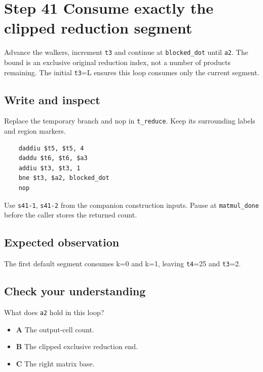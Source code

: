 \section{Step 41 Consume exactly the clipped reduction segment}\label{matmul-s41}

Advance the walkers, increment \texttt{t3} and continue at \texttt{blocked\_dot} until \texttt{a2}. The bound is an exclusive original reduction index, not a number of products remaining. The initial \texttt{t3}=L ensures this loop consumes only the current segment.

\subsection{Write and inspect}
Replace the temporary branch and nop in \texttt{t\_reduce}. Keep its surrounding labels and region markers.

\begin{verbatim}
    daddiu $t5, $t5, 4
    daddu $t6, $t6, $a3
    addiu $t3, $t3, 1
    bne $t3, $a2, blocked_dot
    nop
\end{verbatim}
Use \texttt{s41-1}, \texttt{s41-2} from the companion construction inputs. Pause at \texttt{matmul\_done} before the caller stores the returned count.

\subsection{Expected observation}
The first default segment consumes k=0 and k=1, leaving \texttt{t4}=25 and \texttt{t3}=2.

\subsection{Check your understanding}
What does \texttt{a2} hold in this loop?

\begin{itemize}
  \item \textbf{A} The output-cell count.
  \item \textbf{B} The clipped exclusive reduction end.
  \item \textbf{C} The right matrix base.
\end{itemize}
